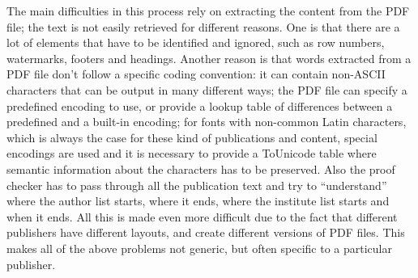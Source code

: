 The main difficulties in this process rely on extracting the content from the PDF file; the text is not easily retrieved for different reasons.
One is that there are a lot of elements that have to be identified and ignored, such as row numbers, watermarks, footers and headings.
Another reason is that words extracted from a PDF file don’t follow a specific coding convention:
it can contain non-ASCII characters that can be output in many different ways;
the PDF file can specify a predefined encoding to use, or provide a lookup table of differences between a predefined and a built-in encoding;
for fonts with non-common Latin characters, which is always the case for these kind of publications and content,
special encodings are used and it is necessary to provide a ToUnicode table where semantic information about the characters has to be preserved.
Also the proof checker has to pass through all the publication text and try to \enquote{understand} where the author list starts, where it ends, where the institute list starts and when it ends.
All this is made even more difficult due to the fact that different publishers have different layouts, and create different versions of PDF files.
This makes all of the above problems not generic,
but often specific to a particular publisher.

